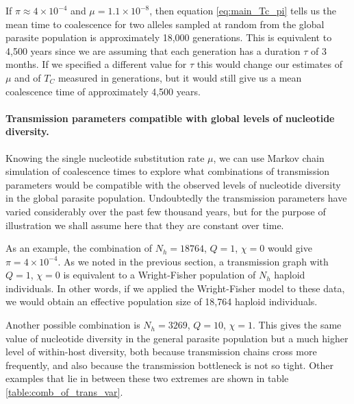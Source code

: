 \documentclass[_main.tex]{subfiles}
\begin{document}



If $\pi \approx 4 \times 10^{-4}$ and $\mu = 1.1 \times 10^{-8}$, then equation \ref{eq:main_Tc_pi} tells us the mean time to coalescence for two alleles sampled at random from the global parasite population is approximately 18,000 generations.  This is equivalent to 4,500 years since we are assuming that each generation has a duration $\tau$ of 3 months.  If we specified a different value for $\tau$ this would change our estimates of $\mu$ and of $T_C$ measured in generations, but it would still give us a mean coalescence time of approximately 4,500 years.

\paragraph{Transmission parameters compatible with global levels of nucleotide diversity.}  Knowing the single nucleotide substitution rate $\mu$, we can use Markov chain simulation of coalescence times to explore what combinations of transmission parameters would be compatible with the observed levels of nucleotide diversity in the global parasite population.  Undoubtedly the transmission parameters have varied considerably over the past few thousand years, but for the purpose of illustration we shall assume here that they are constant over time.   

As an example, the combination of $N_h = 18764$, $Q = 1$, $\chi = 0$ would give $\pi = 4 \times 10^{-4}$.  As we noted in the previous section, a transmission graph with $Q = 1$, $\chi = 0$ is equivalent to a Wright-Fisher population of $N_h$ haploid individuals.  In other words, if we applied the Wright-Fisher model to these data, we would obtain an effective population size of 18,764 haploid individuals.

Another possible combination is $N_h = 3269$, $Q = 10$, $\chi = 1$.  This gives the same value of nucleotide diversity in the general parasite population but a much higher level of within-host diversity, both because transmission chains cross more frequently, and also because the transmission bottleneck is not so tight.  Other examples that lie in between these two extremes are shown in table \ref{table:comb_of_trans_var}.
\end{document}
